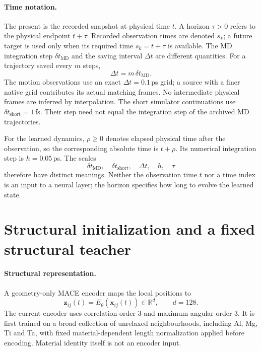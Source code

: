 \documentclass[11pt,a4paper]{article}
\newcommand{\R}{\mathbb R}
\newcommand{\x}{\mathbf x}
\newcommand{\z}{\mathbf z}
\begin{document}
\paragraph{Time notation.}
The present is the recorded snapshot at physical time $t$. A horizon $\tau>0$
refers to the physical endpoint $t+\tau$. Recorded observation times are denoted
$s_k$; a future target is used only when its required time $s_k=t+\tau$ is available.
The MD integration step $\delta t_{\mathrm{MD}}$ and the saving interval $\Delta t$
are different quantities. For a trajectory saved every $m$ steps,
\[
\Delta t=m\,\delta t_{\mathrm{MD}}.
\]
The motion observations use an exact $\Delta t=0.1$\,ps grid; a source with a finer
native grid contributes its actual matching frames. No intermediate physical
frames are inferred by interpolation. The short simulator continuations
use $\delta t_{\mathrm{short}}=1$\,fs. Their step need not equal the integration
step of the archived MD trajectories.

For the learned dynamics, $\rho\geq0$ denotes elapsed physical time after the
observation, so the corresponding absolute time is $t+\rho$. Its numerical
integration step is $h=0.05$\,ps. The scales
\[
\delta t_{\mathrm{MD}},\quad \delta t_{\mathrm{short}},\quad
\Delta t,\quad h,\quad \tau
\]
therefore have distinct meanings. Neither the observation time $t$ nor a time
index is an input to a neural layer; the horizon specifies how long to evolve
the learned state.

\section{Structural initialization and a fixed structural teacher}

\paragraph{Structural representation.}
A geometry-only MACE encoder maps the local positions to
\[
\z_{ij}(t)=E_\theta(\x_{ij}(t))\in\R^d,\qquad d=128.
\]
The current encoder uses correlation order $3$ and maximum angular order $3$.
It is first trained on a broad collection of unrelaxed neighbourhoods, including
Al, Mg, Ti and Ta, with fixed material-dependent length normalization applied
before encoding. Material identity itself is not an encoder input.
\end{document}
